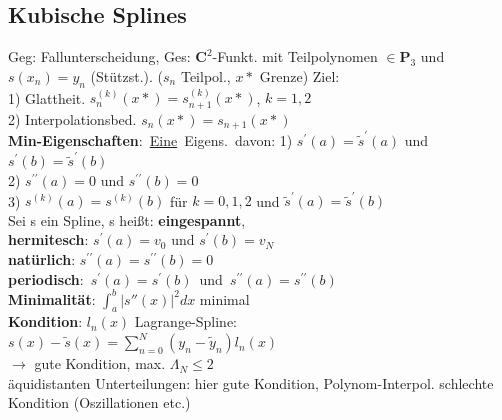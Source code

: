 \subsection{Kubische Splines}
Geg: Fallunterscheidung, Ges: $\mathbf{C}^2$-Funkt. mit Teilpolynomen $\in \mathbf{P}_3$ und $s(x_n) = y_n$
(Stützst.). ($s_n$ Teilpol., $x*$ Grenze) Ziel: \\
1) Glattheit. $s_n^{(k)}(x*) = s_{n+1}^{(k)}(x*)$, $k = 1, 2$\\
2) Interpolationsbed. $s_n(x*) = s_{n+1}(x*)$\\
\mbox{\textbf{Min-Eigenschaften}: \underline{Eine} Eigens. davon:}
1) $s^{\prime}(a) = \widetilde{s}^{\prime}(a)$ und $s^{\prime}(b) = \widetilde{s}^{\prime}(b)$\\
2) $s^{\prime\prime}(a) = 0$ und $s^{\prime\prime}(b) = 0$\\
3) $s^{(k)}(a) = s^{(k)}(b)$ für $k = 0,1,2$ und \hspace*{4mm} $\widetilde{s}^{\prime}(a) = \widetilde{s}^{\prime}(b)$\\
Sei s ein Spline, s heißt: \textbf{eingespannt}, \\
\textbf{hermitesch}: $s^{\prime}(a) = v_0$ und  $s^{\prime}(b) = v_N$\\
\textbf{natürlich}: $s^{\prime\prime}(a) = s^{\prime\prime}(b) = 0$\\
\mbox{\textbf{periodisch}: $s^{\prime}(a) = s^{\prime}(b)$ und $s^{\prime\prime}(a) = s^{\prime\prime}(b)$}\\
\textbf{Minimalität}: $\int_a^b |s''(x)|^2 dx$ minimal\\
\textbf{Kondition}: $l_n(x)$ Lagrange-Spline:
\\$s(x) - \widetilde{s}(x) = \sum_{n=0}^{N}(y_n - \widetilde{y}_n)l_n(x)$\\
$\rightarrow$ gute Kondition, max. $\Lambda_N \leq 2$\\
äquidistanten Unterteilungen: hier gute Kondition, Polynom-Interpol. schlechte Kondition (Oszillationen etc.)

